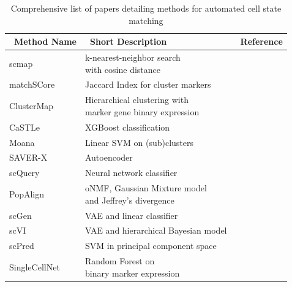 \begin{table}[p] %
\footnotesize
\caption[Methods for automated cell state matching]{Comprehensive list of papers detailing methods for automated cell state matching}
\centering
\label{table:tab_1_2}
\begin{tabular}{l|l|c}
\toprule
~\textbf{Method Name} & ~\textbf{Short Description} & ~\textbf{Reference}  \\
\midrule
scmap & \specialcell[t]{k-nearest-neighbor search\\with cosine distance} & ~\citep{kiselev_scmap:_2018}  \\

matchSCore & Jaccard Index for cluster markers & ~\citep{mereu_matchscore:_2018}\\

ClusterMap & \specialcell[t]{Hierarchical clustering with\\marker gene binary expression} & ~\citep{gao_clustermap:_2018}\\

CaSTLe & XGBoost classification & ~\citep{lieberman_castle_2018}\\

Moana & Linear SVM on (sub)clusters & ~\citep{wagner_moana:_2018}\\

SAVER-X & Autoencoder & ~\citep{wang_transfer_2018}\\

scQuery & Neural network classifier & ~\citep{alavi_web_2018}\\

PopAlign & \specialcell[t]{oNMF, Gaussian Mixture model\\and Jeffrey’s divergence} & ~\citep{chen_dissecting_2018}\\

scGen & VAE and linear classifier & ~\citep{lotfollahi_generative_2018}\\

scVI & VAE and hierarchical Bayesian model & ~\citep{lopez_deep_2018}\\

scPred & SVM in principal component space & ~\citep{alquicira-hernandez_scpred:_2018}\\

SingleCellNet & \specialcell[t]{Random Forest on\\binary marker expression} & ~\citep{tan_singlecellnet:_2018}\\


\end{tabular}
\end{table}
